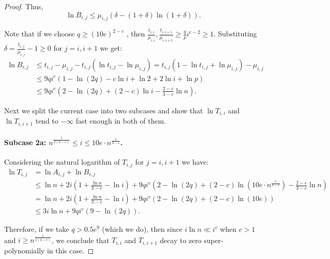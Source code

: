 \documentclass[11pt]{article}
\theoremstyle{definition}
\begin{document}
\begin{proof}
 Thus,
	$$\ln B_{i,j} \le \mu_{i,j}(\delta - (1+\delta)\ln(1+\delta)).$$

	Note that if we choose $q \ge (10e)^{2-c}$ , then  $\frac{t_{i,i}}{\mu_{i,i}}, \frac{t_{i,i+1}}{\mu_{i,i+1}} \ge \frac{q}{p}i^{c-2} \ge 1$.
	Substituting $\delta=\frac{t_{i,j}}{\mu_{i,j}}-1 \ge 0$ for $j=i,i+1$ we get:
	\begin{align*}
		\ln B_{i,j} & \le t_{i,j} - \mu_{i,j} - t_{i,j}(\ln t_{i,j} - \ln \mu_{i,j}) =  t_{i,j}(1- \ln t_{i,j} + \ln \mu_{i,j}) -\mu_{i,j} \\
		& \le 9qi^c \left(1-\ln(2q) - c\ln i + \ln 2 + 2\ln i + \ln p\right) \\
		& \le 9qi^c \left(2-\ln(2q)+(2-c)\ln i - \frac{2-c}{3-c}\ln n\right). 
	\end{align*}
	
	Next we split the current case into two subcases and show that $\ln T_{i,i}$ and $\ln T_{i,i+1}$
	tend to $-\infty$ fast enough in both of them. 
	
	\paragraph{Subcase 2a: $n^{\frac{1}{2(3-c)}} \le i \le 10e\cdot n^{\frac{1}{3-c}}$.}
	Considering the natural logarithm of $T_{i,j}$ for $j=i,i+1$ we have:
	\begin{align*} 
		\ln T_{i,j} & = \ln A_{i,j} + \ln B_{i,j} \\
		& \le \ln n + 2i \left(1+\frac{\ln n}{3-c} - \ln i\right) + 9qi^c \left(2-\ln(2q)+(2-c)\ln\left(10e\cdot n^\frac{1}{3-c}\right)  - \frac{2-c}{3-c}\ln n\right) \\
		& = \ln n + 2i \left(1+\frac{\ln n}{3-c} - \ln i\right) + 9qi^c \left(2-\ln(2q)
		+ (2-c)\ln(10e) \right)\\
		& \le 3i \ln n + 9qi^c(9-\ln(2q)).
	\end{align*}
	
	Therefore, if we take $q>0.5e^9$ (which we do), then since $i\ln n \ll i^{c}$ when $c>1$ and $i \ge n^{\frac{1}{2(3-c)}}$, we conclude that $T_{i,i}$ and $T_{i,i+1}$ decay to zero super-polynomially in this case.
		

\end{proof}
\end{document}
